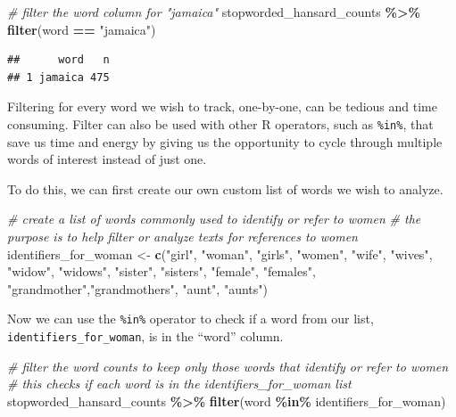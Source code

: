 \documentclass[
]{article}
\newenvironment{Shaded}{\begin{snugshade}}{\end{snugshade}}
\newcommand{\CommentTok}[1]{\textcolor[rgb]{0.56,0.35,0.01}{\textit{#1}}}
\newcommand{\FunctionTok}[1]{\textcolor[rgb]{0.13,0.29,0.53}{\textbf{#1}}}
\newcommand{\NormalTok}[1]{#1}
\newcommand{\OtherTok}[1]{\textcolor[rgb]{0.56,0.35,0.01}{#1}}
\newcommand{\SpecialCharTok}[1]{\textcolor[rgb]{0.81,0.36,0.00}{\textbf{#1}}}
\newcommand{\StringTok}[1]{\textcolor[rgb]{0.31,0.60,0.02}{#1}}
\begin{document}
\begin{Shaded}
\begin{Highlighting}[]
\CommentTok{\# filter the word column for "jamaica"}
\NormalTok{stopworded\_hansard\_counts }\SpecialCharTok{\%\textgreater{}\%} 
  \FunctionTok{filter}\NormalTok{(word }\SpecialCharTok{==} \StringTok{"jamaica"}\NormalTok{)}
\end{Highlighting}
\end{Shaded}

\begin{verbatim}
##      word   n
## 1 jamaica 475
\end{verbatim}

Filtering for every word we wish to track, one-by-one, can be tedious
and time consuming. Filter can also be used with other R operators, such
as \texttt{\%in\%}, that save us time and energy by giving us the
opportunity to cycle through multiple words of interest instead of just
one.

To do this, we can first create our own custom list of words we wish to
analyze.

\begin{Shaded}
\begin{Highlighting}[]
\CommentTok{\# create a list of words commonly used to identify or refer to women}
\CommentTok{\# the purpose is to help filter or analyze texts for references to women}
\NormalTok{identifiers\_for\_woman }\OtherTok{\textless{}{-}} \FunctionTok{c}\NormalTok{(}\StringTok{"girl"}\NormalTok{, }\StringTok{"woman"}\NormalTok{, }\StringTok{"girls"}\NormalTok{, }\StringTok{"women"}\NormalTok{, }\StringTok{"wife"}\NormalTok{, }\StringTok{"wives"}\NormalTok{, }\StringTok{"widow"}\NormalTok{, }\StringTok{"widows"}\NormalTok{, }\StringTok{"sister"}\NormalTok{, }
                          \StringTok{"sisters"}\NormalTok{, }\StringTok{"female"}\NormalTok{, }\StringTok{"females"}\NormalTok{, }\StringTok{"grandmother"}\NormalTok{,}\StringTok{"grandmothers"}\NormalTok{, }\StringTok{"aunt"}\NormalTok{, }\StringTok{"aunts"}\NormalTok{)}
\end{Highlighting}
\end{Shaded}

Now we can use the \texttt{\%in\%} operator to check if a word from our
list, \texttt{identifiers\_for\_woman}, is in the ``word'' column.

\begin{Shaded}
\begin{Highlighting}[]
\CommentTok{\# filter the word counts to keep only those words that identify or refer to women}
\CommentTok{\# this checks if each word is in the \textquotesingle{}identifiers\_for\_woman\textquotesingle{} list}
\NormalTok{stopworded\_hansard\_counts }\SpecialCharTok{\%\textgreater{}\%} 
  \FunctionTok{filter}\NormalTok{(word }\SpecialCharTok{\%in\%}\NormalTok{ identifiers\_for\_woman)}
\end{Highlighting}
\end{Shaded}
\end{document}
